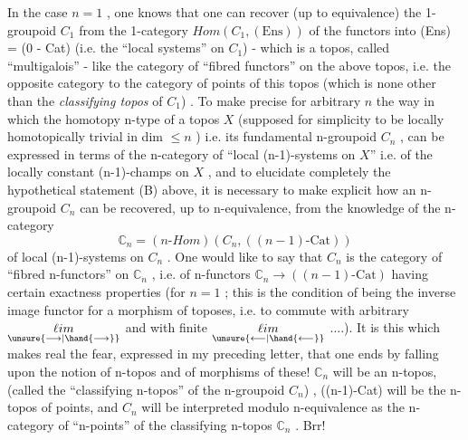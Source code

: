 
In the case $n = 1$ , one knows that one can recover (up to equivalence)
the 1-groupoid $C_1$ from the 1-category $\mathit{Hom}(C_1, (\mathrm{Ens}))$ of the functors into
(Ens) = (0 - Cat) (i.e. the ``local systems'' on $C_1$) - which is a topos, called
``multigalois'' - like the category of ``fibred functors'' on the above topos,
i.e. the opposite category to the category of points of this topos (which
is none other than the \textit{classifying topos} of $C_1$) . To make precise for
arbitrary $n$ the way in which the homotopy n-type of a topos $X$ (supposed
for simplicity to be locally homotopically trivial in dim $\leq n$ ) i.e. its
fundamental n-groupoid $C_n$ , can be expressed in terms of the n-category of
``local (n-1)-systems on $X$'' i.e. of the locally constant (n-1)-champs on $X$ ,
and to elucidate completely the hypothetical statement (B) above, it is
necessary to make explicit how an n-groupoid $C_n$ can be recovered, up to
n-equivalence, from the knowledge of the n-category
\[ \mathbb{C}_n = (n\text{-}\mathit{Hom})(C_n , ((n-1)\text{-}\mathrm{Cat})) \]
of local (n-1)-systems on $C_n$ . One would like to say that $C_n$ is the category
of ``fibred n-functors'' on $\mathbb{C}_n$ , i.e. of n-functors $\mathbb{C}_n \rightarrow ((n-1)\text{-}\mathrm{Cat})$ having
certain exactness properties (for $n = 1$ ; this is the condition of being
the inverse image functor for a morphism of toposes, i.e. to commute with
arbitrary $\underset{\unsure{\longrightarrow|\hand{\longrightarrow}}}{\ell im}$ and with finite $\underset{\unsure{\longleftarrow|\hand{\longleftarrow}}}{\ell im}$ ....). It is this which makes real
the fear, expressed in my preceding letter, that one ends by falling upon
the notion of n-topos and of morphisms of these! $\mathbb{C}_n$ will be an n-topos,
(called the ``classifying n-topos'' of the n-groupoid $C_n$) , ((n-1)-Cat) will
be the n-topos of points, and $C_n$ will be interpreted modulo n-equivalence
as the n-category of ``n-points'' of the classifying n-topos $\mathbb{C}_n$ . Brr!


